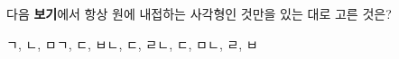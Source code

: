 다음 \textbf{보기}에서 항상 원에 내접하는 사각형인 것만을 있는 대로 고른 것은?
\begin{choices32}{ㄱ, ㄴ, ㅁ}{ㄱ, ㄷ, ㅂ}{ㄴ, ㄷ, ㄹ}{ㄴ, ㄷ, ㅁ}{ㄴ, ㄹ, ㅂ}\end{choices32}
